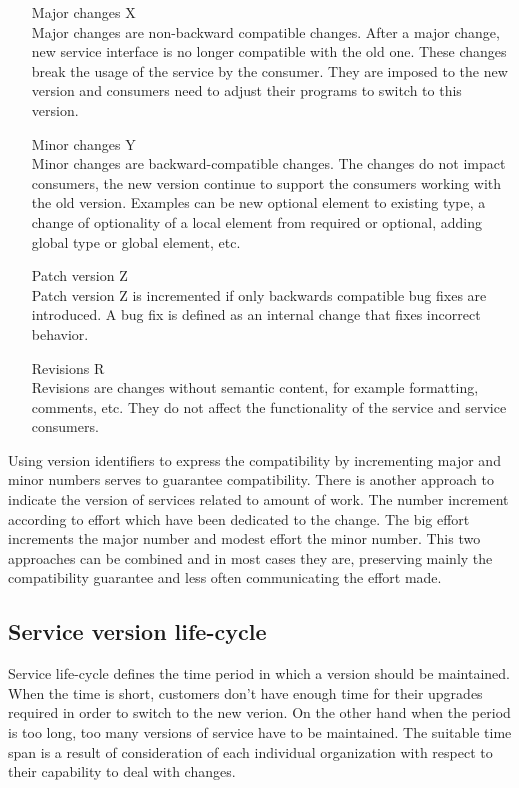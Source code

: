 \begin{enumerate}
  \item[Major changes X] \hfill \\
  Major changes are non-backward compatible changes. After a major change, new service interface is no longer compatible with the old one. These changes break the usage of the service by the consumer. They are imposed to the new version and consumers need to adjust their programs to switch to this version. 
  
    \item[Minor changes Y] \hfill \\
  Minor changes are backward-compatible changes. The changes do not impact consumers, the new version continue to support the consumers working with the old version. Examples can be new optional element to existing type, a change of optionality of a local element from required or optional, adding global type or global element, etc.
  
  \item[Patch version Z] \hfill \\  
  Patch version Z is incremented if only backwards compatible bug fixes are introduced. A bug fix is defined as an internal change that fixes incorrect behavior.
  
  \item[Revisions R] \hfill \\ 
  Revisions are changes without semantic content, for example formatting, comments, etc. They do not affect the functionality of the service and service consumers.
\end{enumerate} 

Using version identifiers to express the compatibility by incrementing major and minor numbers serves to guarantee compatibility. There is another approach to indicate the version of services related to amount of work. The number increment according to effort which have been dedicated to the change. The big effort increments the major number and modest effort the minor number. This two approaches can be combined and in most cases they are, preserving mainly the compatibility guarantee and less often communicating the effort made. \cite{soa-governance}


\subsection{Service version life-cycle}
Service life-cycle defines the time period in which a version should be maintained. When the time is short, customers don't have enough time for their upgrades required in order to switch to the new verion. On the other hand when the period is too long, too many versions of service have to be maintained. The suitable time span is a result of consideration of each individual organization with respect to their capability to deal with changes.

